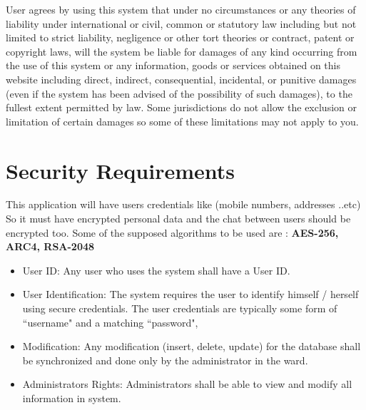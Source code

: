 \documentclass{scrreprt}
\begin{document}
User agrees by using this system that under no circumstances or any theories of liability under international or civil, common or statutory law including but not limited to strict liability, negligence or other tort theories or contract, patent or copyright laws, will the system be liable for damages of any kind occurring from the use of this system or any information, goods or services obtained on this website including direct, indirect, consequential, incidental, or punitive damages (even if the system has been advised of the possibility of such damages), to the fullest extent permitted by law. Some jurisdictions do not allow the exclusion or limitation of certain damages so some of these limitations may not apply to you.




\section{Security Requirements}
This application will have users credentials like (mobile numbers, addresses ..etc)
So it must have encrypted personal data and the chat between users should be encrypted too.
Some of the supposed algorithms to be used are : \textbf{AES-256, ARC4, RSA-2048}\\



\begin{itemize}

    \item User ID: Any user who uses the system shall have a User ID.
    \item User Identification: The system requires the user to identify himself / herself using secure credentials. The user credentials are typically some form of ``username" and a matching ``password", 

\item  Modification: Any modification (insert, delete, update) for the database shall be synchronized and done only by the administrator in the ward.
\item Administrators Rights: Administrators shall be able to view and modify all information in system.
\end{itemize}
\end{document}
